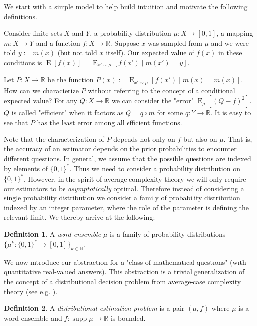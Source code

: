 \documentclass{article}
\theoremstyle{definition}
\newtheorem{definition}{Definition}[section]
\theoremstyle{plain}
\newcommand{\Words}{{\{ 0, 1 \}^*}}
\DeclareMathOperator{\Supp}{supp}
\DeclareMathOperator{\E}{E}
\newcommand{\Nats}{\mathbb{N}}
\newcommand{\Reals}{\mathbb{R}}
\begin{document}
We start with a simple model to help build intuition and motivate the following definitions.

Consider finite sets $X$ and $Y$, a probability distribution $\mu: X \rightarrow [0,1]$, a mapping $m: X \rightarrow Y$ and a function $f: X \rightarrow \Reals$. Suppose $x$ was sampled from $\mu$ and we were told $y := m(x)$ (but not told $x$ itself). Our expected value of $f(x)$ in these conditions is $\E[f(x)] = \E_{x' \sim \mu}[f(x') \mid m(x') = y]$.

Let $P: X \rightarrow \Reals$ be the function $P(x) := \E_{x' \sim \mu}[f(x') \mid m(x) = m(x)]$. How can we characterize $P$ without referring to the concept of a conditional expected value? For any $Q: X \rightarrow \Reals$ we can consider the "error" $\E_\mu[(Q - f)^2]$. $Q$ is called "efficient" when it factors as $Q = q \circ m$ for some $q: Y \rightarrow \Reals$. It is easy to see that $P$ has the least error among all efficient functions.

Note that the characterization of $P$ depends not only on $f$ but also on $\mu$. That is, the accuracy of an estimator depends on the prior probabilities to encounter different questions. In general, we assume that the possible questions are indexed by elements of $\Words$. Thus we need to consider a probability distribution on $\Words$. However, in the spirit of average-complexity theory we will only require our estimators to be \emph{asymptotically} optimal. Therefore instead of considering a single probability distribution we consider a family of probability distribution indexed by an integer parameter, where the role of the parameter is defining the relevant limit. We thereby arrive at the following:

\begin{definition}

A \emph{word ensemble} $\mu$ is a family of probability distributions $\{\mu^k: \Words \rightarrow [0,1]\}_{k \in \Nats}$.

\end{definition}

We now introduce our abstraction for a "class of mathematical questions" (with quantitative real-valued answers). This abstraction is a trivial generalization of the concept of a distributional decision problem from average-case complexity theory (see e.g. \cite{Bogdanov_2006}).

\begin{definition}

A \emph{distributional estimation problem} is a pair $(\mu,f)$ where $\mu$ is a word ensemble and $f: \Supp \mu \rightarrow \Reals$ is bounded.

\end{definition}
\end{document}
